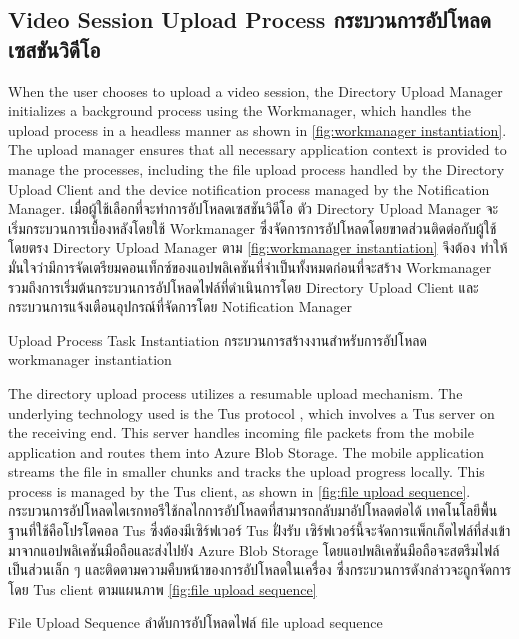 \subsection{\ifenglish Video Session Upload Process \else กระบวนการอัปโหลดเซสชันวิดีโอ \fi}

\ifenglish
When the user chooses to upload a video session, the Directory Upload Manager initializes a background process using the Workmanager, which handles the upload process in a headless manner as shown in \autoref{fig:workmanager instantiation}. The upload manager ensures that all necessary application context is provided to manage the processes, including the file upload process handled by the Directory Upload Client and the device notification process managed by the Notification Manager.
\else
เมื่อผู้ใช้เลือกที่จะทำการอัปโหลดเซสชันวิดีโอ ตัว Directory Upload Manager จะเริ่มกระบวนการเบื้องหลังโดยใช้ Workmanager ซึ่งจัดการการอัปโหลดโดยขาดส่วนติดต่อกับผู้ใช้โดยตรง Directory Upload Manager ตาม \autoref{fig:workmanager instantiation} จึงต้อง ทำให้มั่นใจว่ามีการจัดเตรียมคอนเท็กซ์ของแอปพลิเคชันที่จำเป็นทั้งหมดก่อนที่จะสร้าง Workmanager รวมถึงการเริ่มต้นกระบวนการอัปโหลดไฟล์ที่ดำเนินการโดย Directory Upload Client และกระบวนการแจ้งเตือนอุปกรณ์ที่จัดการโดย Notification Manager
\fi

{\ifenglish Upload Process Task Instantiation \else กระบวนการสร้างงานสำหรับการอัปโหลด \fi}
{workmanager instantiation}

\ifenglish
The directory upload process utilizes a resumable upload mechanism. The underlying technology used is the Tus protocol \cite{tus-doc}, which involves a Tus server on the receiving end. This server handles incoming file packets from the mobile application and routes them into Azure Blob Storage. The mobile application streams the file in smaller chunks and tracks the upload progress locally. This process is managed by the Tus client, as shown in \autoref{fig:file upload sequence}.
\else
กระบวนการอัปโหลดไดเรกทอรีใช้กลไกการอัปโหลดที่สามารถกลับมาอัปโหลดต่อได้ เทคโนโลยีพื้นฐานที่ใช้คือโปรโตคอล Tus \cite{tus-doc} ซึ่งต้องมีเซิร์ฟเวอร์ Tus ฝั่งรับ เซิร์ฟเวอร์นี้จะจัดการแพ็กเก็ตไฟล์ที่ส่งเข้ามาจากแอปพลิเคชันมือถือและส่งไปยัง Azure Blob Storage โดยแอปพลิเคชันมือถือจะสตรีมไฟล์เป็นส่วนเล็ก ๆ และติดตามความคืบหน้าของการอัปโหลดในเครื่อง ซึ่งกระบวนการดังกล่าวจะถูกจัดการโดย Tus client ตามแผนภาพ \autoref{fig:file upload sequence}
\fi

{\ifenglish File Upload Sequence \else ลำดับการอัปโหลดไฟล์ \fi}
{file upload sequence}

